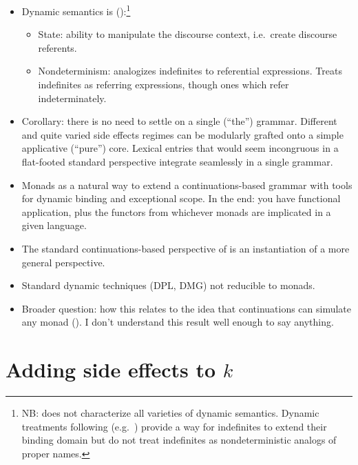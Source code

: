 \begin{itemize}
	\item Dynamic semantics is (\citealt{Shan:2001}):\footnote{NB: does not characterize all varieties of dynamic semantics. Dynamic treatments following \citealt{GroenendijkStokhof:1990} (e.g.~\citealt{Zimmermann:1991, Dekker:1993, Szabolcsi:2003, Groote:2006}) provide a way for indefinites to extend their binding domain but do not treat indefinites as nondeterministic analogs of proper names.}%
	\begin{itemize}
		\item State: ability to manipulate the discourse context, i.e.~create discourse referents.%
		\item Nondeterminism: analogizes indefinites to referential expressions. Treats indefinites as referring expressions, though ones which refer indeterminately.%
	\end{itemize}
	
	\item Corollary: there is no need to settle on a single (``the'') grammar. Different and quite varied side effects regimes can be modularly grafted onto a simple applicative (``pure'') core. Lexical entries that would seem incongruous in a flat-footed standard perspective integrate seamlessly in a single grammar. %
	
	\item Monads as a natural way to extend a continuations-based grammar with tools for dynamic binding and exceptional scope. In the end: you have functional application, plus the functors from whichever monads are implicated in a given language. %
	
	\item The standard continuations-based perspective of \citealt{Barker:2002, ShanBarker:2006, BarkerShan:2014} is an instantiation of a more general perspective.%
	
	\item Standard dynamic techniques (DPL, DMG) not reducible to monads. 
	
	\item Broader question: how this relates to the idea that continuations can simulate any monad (\citealt{Filinski:1994}). I don't understand this result well enough to say anything. %
\end{itemize}

\section{Adding side effects to $k$}

